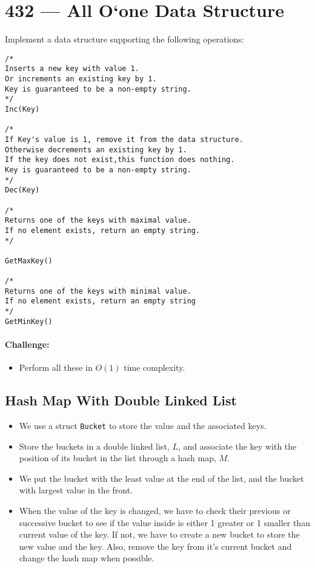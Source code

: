 \section{432 --- All O`one Data Structure}
Implement a data structure supporting the following operations:


\begin{lstlisting}[style=customc]
/*
Inserts a new key with value 1. 
Or increments an existing key by 1. 
Key is guaranteed to be a non-empty string.
*/
Inc(Key) 

/*
If Key's value is 1, remove it from the data structure. 
Otherwise decrements an existing key by 1. 
If the key does not exist,this function does nothing. 
Key is guaranteed to be a non-empty string.
*/
Dec(Key)

/*
Returns one of the keys with maximal value. 
If no element exists, return an empty string.
*/

GetMaxKey()

/*
Returns one of the keys with minimal value. 
If no element exists, return an empty string
*/
GetMinKey()
\end{lstlisting}

\paragraph{Challenge:} 
\begin{itemize}
\item Perform all these in $O(1)$ time complexity.
\end{itemize}

\subsection{Hash Map With Double Linked List}
\begin{itemize}
\item We use a struct \texttt{Bucket} to store the value and the associated keys.
\item Store the buckets in a double linked list, $L$, and associate the key with the position of its bucket in the list through a hash map, $M$.
\item We put the bucket with the least value at the end of the list, and the bucket with largest value in the front.
\item When the value of the key is changed, we have to check their previous or successive bucket to see if the value inside is either 1 greater or 1 smaller than current value of the key. If not, we have to create a new bucket to store the new value and the key. Also, remove the key from it's current bucket and change the hash map when possible.
\end{itemize}



